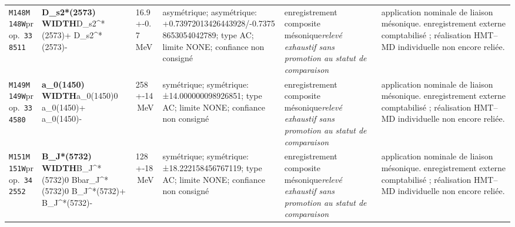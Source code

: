 \begin{landscape}
\begin{longtable}{L{1.85cm}L{4.45cm}L{2.35cm}L{4.05cm}L{3.35cm}L{7.15cm}}
\texttt{M148}\newline \texttt{M148W}\newline prop.\ \texttt{338511} & \textbf{D\_\allowbreak{}s2*(2573) WIDTH}\newline D\_\allowbreak{}s2\textasciicircum{}*(2573)+ \textbar{}\allowbreak{} D\_\allowbreak{}s2\textasciicircum{}*(2573)- & 16.9+-0.7\,MeV & asymétrique; asymétrique: +0.73972013426443928/-0.73758653054042789; type AC; limite NONE; confiance non consigné & enregistrement composite mésonique\newline \emph{relevé exhaustif sans promotion au statut de comparaison} & application nominale de liaison mésonique. enregistrement externe comptabilisé ; réalisation HMT--MD individuelle non encore reliée. \\
\texttt{M149}\newline \texttt{M149W}\newline prop.\ \texttt{334580} & \textbf{a\_\allowbreak{}0(1450) WIDTH}\newline a\_\allowbreak{}0(1450)0 \textbar{}\allowbreak{} a\_\allowbreak{}0(1450)+ \textbar{}\allowbreak{} a\_\allowbreak{}0(1450)- & 258+-14\,MeV & symétrique; symétrique: ±14.000000098926851; type AC; limite NONE; confiance non consigné & enregistrement composite mésonique\newline \emph{relevé exhaustif sans promotion au statut de comparaison} & application nominale de liaison mésonique. enregistrement externe comptabilisé ; réalisation HMT--MD individuelle non encore reliée. \\
\texttt{M151}\newline \texttt{M151W}\newline prop.\ \texttt{342552} & \textbf{B\_\allowbreak{}J*(5732) WIDTH}\newline B\_\allowbreak{}J\textasciicircum{}*(5732)0 \textbar{}\allowbreak{} Bbar\_\allowbreak{}J\textasciicircum{}*(5732)0 \textbar{}\allowbreak{} B\_\allowbreak{}J\textasciicircum{}*(5732)+ \textbar{}\allowbreak{} B\_\allowbreak{}J\textasciicircum{}*(5732)- & 128+-18\,MeV & symétrique; symétrique: ±18.222158456767119; type AC; limite NONE; confiance non consigné & enregistrement composite mésonique\newline \emph{relevé exhaustif sans promotion au statut de comparaison} & application nominale de liaison mésonique. enregistrement externe comptabilisé ; réalisation HMT--MD individuelle non encore reliée. \\

\end{longtable}
\end{landscape}
